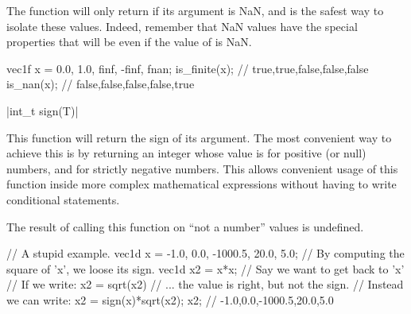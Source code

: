 The  function will only return  if its argument is NaN, and is the safest way to isolate these values. Indeed, remember that NaN values have the special properties that  will be  even if the value of  is NaN.

\begin{example}
\begin{cppcode}
vec1f x = {0.0, 1.0, finf, -finf, fnan};
is_finite(x); // {true,true,false,false,false}
is_nan(x);    // {false,false,false,false,true}
\end{cppcode}
\end{example}

\funcitem \vectorfunc \cppinline|int_t sign(T)| 

This function will return the sign of its argument. The most convenient way to achieve this is by returning an integer whose value is  for positive (or null) numbers, and  for strictly negative numbers. This allows convenient usage of this function inside more complex mathematical expressions without having to write conditional statements.

The result of calling this function on ``not a number'' values is undefined.

\begin{example}
\begin{cppcode}
// A stupid example.
vec1d x = {-1.0, 0.0, -1000.5, 20.0, 5.0};
// By computing the square of 'x', we loose its sign.
vec1d x2 = x*x;
// Say we want to get back to 'x'
// If we write: x2 = sqrt(x2)
// ... the value is right, but not the sign.
// Instead we can write:
x2 = sign(x)*sqrt(x2);
x2; // {-1.0,0.0,-1000.5,20.0,5.0}
\end{cppcode}
\end{example}
